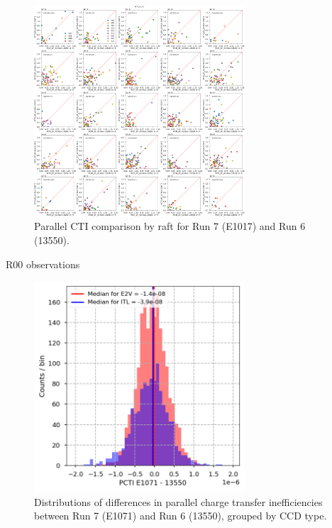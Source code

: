 \begin{figure}[H]
\begin{centering}
\includegraphics[width=0.7\textwidth]{figures/baselineCharacterization/13550_E1071_PCTI_EF_43_inset.png}
\caption{Parallel CTI comparison by raft for Run 7 (E1017) and Run 6 (13550).}
\label{fig:parallel-cti}
\end{centering}
\end{figure}

R00 observations

\begin{figure}[H]
\begin{centering}
\includegraphics[width=0.7\textwidth]{figures/baselineCharacterization/PCTI_13550_E1071_diff.png}
\caption{Distributions of differences in parallel charge transfer inefficiencies between Run 7 (E1071) and Run 6 (13550), grouped by CCD type.}
\label{fig:parallel-cti-dist}
\end{centering}
\end{figure}

